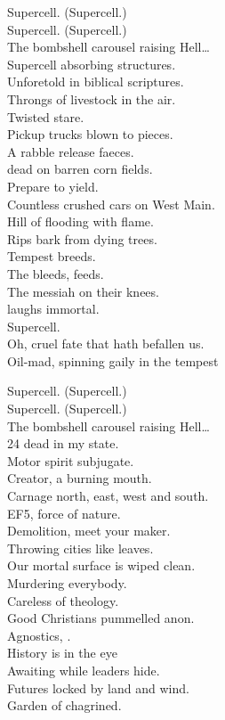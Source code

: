 Supercell. (Supercell.) \\
Supercell. (Supercell.) \\
The bombshell carousel raising Hell… \\

Supercell absorbing structures. \\
Unforetold in biblical scriptures. \\
Throngs of livestock in the air. \\
Twisted stare. \\
Pickup trucks blown to pieces. \\
A rabble release faeces. \\
 dead on barren corn fields. \\
Prepare to yield. \\

Countless crushed cars on West Main. \\
Hill of  flooding with flame. \\
Rips bark from dying trees. \\
Tempest breeds. \\
The  bleeds,  feeds. \\
The messiah on their knees. \\
 laughs immortal. \\
Supercell. \\

Oh, cruel fate that hath befallen us. \\
Oil-mad, spinning gaily in the tempest\

Supercell. (Supercell.) \\
Supercell. (Supercell.) \\
The bombshell carousel raising Hell… \\

24 dead in my state. \\
Motor spirit subjugate. \\
Creator, a burning mouth. \\
Carnage north, east, west and south. \\
EF5, force of nature. \\
Demolition, meet your maker. \\
Throwing cities like leaves. \\
Our mortal surface is wiped clean. \\

Murdering everybody. \\
Careless of theology. \\
Good Christians pummelled anon. \\
Agnostics, . \\
History is in the eye \\
Awaiting  while leaders hide. \\
Futures locked by land and wind. \\
Garden of  chagrined. \\

